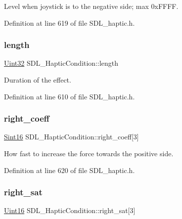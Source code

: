 Level when joystick is to the negative side; max 0x\+F\+F\+FF. 

Definition at line 619 of file S\+D\+L\+\_\+haptic.\+h.

\mbox{\label{struct_s_d_l___haptic_condition_ad0efb0a6ddc20f058e87199eaaa95978}} 
\subsubsection{\texorpdfstring{length}{length}}
{\footnotesize\ttfamily \mbox{\hyperlink{_s_d_l__stdinc_8h_add440eff171ea5f55cb00c4a9ab8672d}{Uint32}} S\+D\+L\+\_\+\+Haptic\+Condition\+::length}

Duration of the effect. 

Definition at line 610 of file S\+D\+L\+\_\+haptic.\+h.

\mbox{\label{struct_s_d_l___haptic_condition_a3de7f164ef88841255535387d0f100b6}} 
\subsubsection{\texorpdfstring{right\_coeff}{right\_coeff}}
{\footnotesize\ttfamily \mbox{\hyperlink{_s_d_l__stdinc_8h_a9d0257032c0e146ab6121bf0122712f5}{Sint16}} S\+D\+L\+\_\+\+Haptic\+Condition\+::right\+\_\+coeff\mbox{[}3\mbox{]}}

How fast to increase the force towards the positive side. 

Definition at line 620 of file S\+D\+L\+\_\+haptic.\+h.

\mbox{\label{struct_s_d_l___haptic_condition_a90427a1e0d464b4b53abc1d419c97b2e}} 
\subsubsection{\texorpdfstring{right\_sat}{right\_sat}}
{\footnotesize\ttfamily \mbox{\hyperlink{_s_d_l__stdinc_8h_a31fcc0a076c9068668173ee26d33e42b}{Uint16}} S\+D\+L\+\_\+\+Haptic\+Condition\+::right\+\_\+sat\mbox{[}3\mbox{]}}

